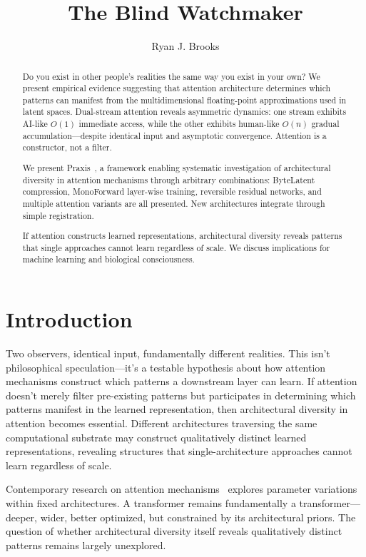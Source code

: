 \documentclass{article}
\begin{document}
\title{The Blind Watchmaker}
\author{Ryan J. Brooks}
\date{}

\maketitle

\begin{abstract}
    Do you exist in other people's realities the same way you exist in your own? We present empirical evidence suggesting that attention architecture determines which patterns can manifest from the multidimensional floating-point approximations used in latent spaces. Dual-stream attention reveals asymmetric dynamics: one stream exhibits AI-like $O(1)$ immediate access, while the other exhibits human-like $O(n)$ gradual accumulation—despite identical input and asymptotic convergence. Attention is a constructor, not a filter.

    We present Praxis~\cite{praxis2025}, a framework enabling systematic investigation of architectural diversity in attention mechanisms through arbitrary combinations: ByteLatent compression, MonoForward layer-wise training, reversible residual networks, and multiple attention variants are all presented. New architectures integrate through simple registration.

    If attention constructs learned representations, architectural diversity reveals patterns that single approaches cannot learn regardless of scale. We discuss implications for machine learning and biological consciousness.
\end{abstract}

\section{Introduction}

Two observers, identical input, fundamentally different realities. This isn't philosophical speculation—it's a testable hypothesis about how attention mechanisms construct which patterns a downstream layer can learn. If attention doesn't merely filter pre-existing patterns but participates in determining which patterns manifest in the learned representation, then architectural diversity in attention becomes essential. Different architectures traversing the same computational substrate may construct qualitatively distinct learned representations, revealing structures that single-architecture approaches cannot learn regardless of scale.

Contemporary research on attention mechanisms~\cite{vaswani2017attention} explores parameter variations within fixed architectures. A transformer remains fundamentally a transformer—deeper, wider, better optimized, but constrained by its architectural priors. The question of whether architectural diversity itself reveals qualitatively distinct patterns remains largely unexplored.
\end{document}
